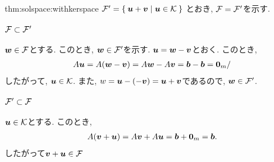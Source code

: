 \begin{proofof}{thm:solspace:withkerspace}
$\FFF'=\Set{\uu+\vv|\uu\in\KKK}$
  とおき,
  $\FFF=\FFF'$を示す.
  \paragraph{$\FFF\subset\FFF'$}
  $\ww\in \FFF$とする.
  このとき,   $\ww\in\FFF'$を示す.
  $\uu=\ww-\vv$とおく.
  このとき,
  \begin{align*}
    A\uu=A(\ww-\vv)=A\ww-A\vv=\bbb-\bbb=\zzero_m/
  \end{align*}
  したがって, $\uu\in\KKK$.
  また, $w=\uu-(-\vv)=\uu+\vv$であるので,
  $\ww\in\FFF'$.

  \paragraph{$\FFF'\subset\FFF$}
  $\uu\in\KKK$とする.
  このとき,
  \begin{align*}
    A(\vv+\uu)=A\vv+A\uu=\bbb+\zzero_m=\bbb.
  \end{align*}
  したがって$\vv+\uu\in\FFF$
\end{proofof}

\endinput

\section{逆行列や正則に関する命題の証明}
ここでは, \Cref{chap:inverse}に現れる命題の証明を行う.
逆行列や正則行列に関する命題については,
一般の正方行列の場合について証明をしているので,
煩雑になっている部分がある.
$2$-次正方行列の場合のみについて証明をするのであれば,
直接計算をすることで示すほうが手っ取り早いものが多い.
行列式に関する命題は,
行列式を$2$次正方行列にしかここでは定義していないこともあり,
$2$-次正方行列の場合のみについて証明をしている.





